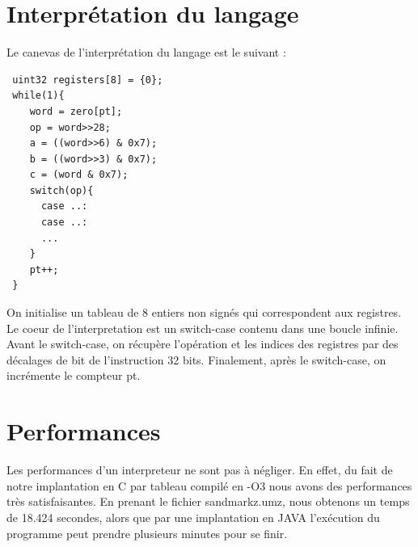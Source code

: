 \documentclass[a4paper,12pt]{report}
\begin{document}
\section{Interprétation du langage}
Le canevas de l'interprétation du langage est le suivant :
\begin{verbatim}
 uint32 registers[8] = {0};
 while(1){
    word = zero[pt];
    op = word>>28;
    a = ((word>>6) & 0x7);
    b = ((word>>3) & 0x7);
    c = (word & 0x7);
    switch(op){
      case ..:
      case ..:
      ...
    }
    pt++;
 }
\end{verbatim}
On initialise un tableau de 8 entiers non signés qui correspondent aux registres.
Le coeur de l'interpretation est un switch-case contenu dans une boucle infinie. Avant le switch-case, on récupère l'opération et les indices des registres 
par des décalages de bit de l'instruction 32 bits. Finalement, après le switch-case, on incrémente le compteur pt.

\section{Performances}
Les performances d'un interpreteur ne sont pas à négliger. En effet, du fait de notre implantation en C par tableau compilé en -O3 nous avons des
performances très satisfaisantes.
En prenant le fichier sandmarkz.umz, nous obtenons un temps de 18.424 secondes, alors que par une implantation en JAVA l'exécution du programme peut prendre plusieurs minutes pour se finir.
\end{document}
